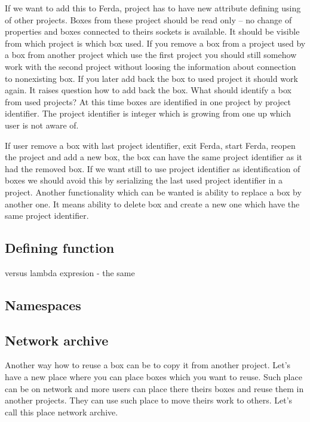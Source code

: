 \documentclass{article}
\begin{document}
If we want to add this to Ferda, project has to have new attribute defining using of other projects. Boxes from these project should be read only -- no change of properties and boxes connected to theirs sockets is available. It should be visible from which project is which box used. If you remove a box from a project used by a box from another project which use the first project you should still somehow work with the second project without loosing the information about connection to nonexisting box. If you later add back the box to used project it should work again. It raises question how to add back the box. What should identify a box from used projects? At this time boxes are identified in one project by project identifier. The project identifier is integer which is growing from one up which user is not aware of.

If user remove a box with last project identifier, exit Ferda, start Ferda, reopen the project and add a new box, the box can have the same project identifier as it had the removed box. If we want still to use project identifier as identification of boxes we should avoid this by serializing the last used project identifier in a project. Another functionality which can be wanted is ability to replace a box by another one. It means ability to delete box and create a new one which have the same project identifier.

\subsection{Defining function}
versus lambda expresion - the same
\subsection{Namespaces}
\subsection{Network archive}
Another way how to reuse a box can be to copy it from another project. Let's have a new place where you can place boxes which you want to reuse. Such place can be on network and more users can place there theirs boxes and reuse them in another projects. They can use such place to move theirs work to others. Let's call this place network archive.
\end{document}
